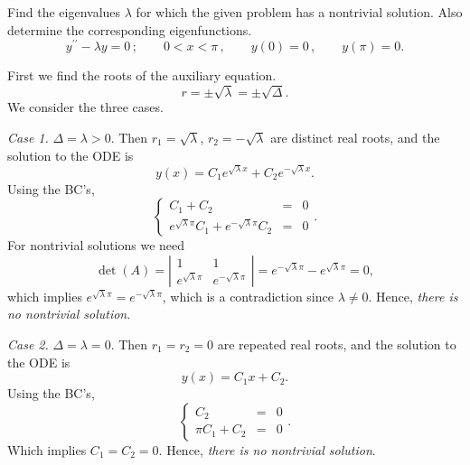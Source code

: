 \documentclass[11pt]{article}
\begin{document}
\begin{problem}
Find the eigenvalues $\lambda$ for which the given problem has a nontrivial solution. Also determine the corresponding eigenfunctions.
\begin{equation*}
y^{\prime \prime} - \lambda y =0\,; \qquad  0<x<\pi \,, \qquad y(0)=0  \,,\qquad y(\pi) =0. 
\end{equation*}
\end{problem}
\begin{solution}
First we find the roots of the auxiliary equation.
\[r=\pm\sqrt{\lambda}=\pm\sqrt{\Delta}.\]
We consider the three cases.

\par \textsl{Case 1.} $\Delta = \lambda >0$. Then $r_{1}=\sqrt{\lambda}$, $r_{2}=-\sqrt{\lambda}$ are distinct real roots, and the solution to the ODE is
\[y(x)=C_{1}e^{\sqrt{\lambda}x}+C_{2}e^{-\sqrt{\lambda}x}.\]
Using the BC's,
\begin{equation*}
\left\{\begin{array}{rcl}
       C_{1} +C_{2} & = & 0\\
       e^{\sqrt{\lambda}\pi}C_{1} + e^{-\sqrt{\lambda}\pi}C_{2}& = & 0
      \end{array}\right. .
\end{equation*}
For nontrivial solutions we need 
$$\det(A)=\left|\begin{matrix}1&1\\e^{\sqrt{\lambda}\pi} & e^{-\sqrt{\lambda}\pi}\end{matrix}\right|=e^{-\sqrt{\lambda}\pi}-e^{\sqrt{\lambda}\pi}=0,$$ 
which implies $e^{\sqrt{\lambda}\pi}=e^{-\sqrt{\lambda}\pi}$, which is a contradiction since $\lambda\neq 0$. Hence, \textsl{there is no nontrivial solution}.

\par \textsl{Case 2.} $\Delta = \lambda =0$. Then $r_{1}=r_{2}=0$ are repeated real roots, and the solution to the ODE is
\[y(x)=C_{1}x+C_{2}.\]
Using the BC's,
\begin{equation*}
\left\{\begin{array}{rcl}
       C_{2} & = & 0\\
       \pi C_{1} + C_{2} & = & 0
      \end{array}\right. .
\end{equation*}
Which implies $C_{1}=C_{2}=0$. Hence, \textsl{there is no nontrivial solution}.


\end{solution}
\end{document}
